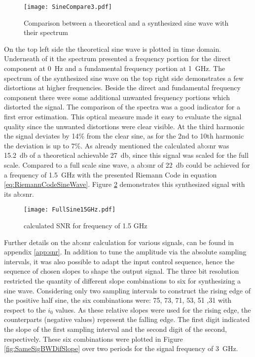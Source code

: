 \begin{figure}[htb!]
	\centering
  \texttt{[image: SineCompare3.pdf]}
	\caption{Comparison between a theoretical and a synthesized sine wave with their spectrum}
	\label{fig:SineCompare}
\end{figure}

On the top left side the theoretical sine wave is plotted in time domain. 
Underneath of it the spectrum presented a frequency portion for the direct component at \SI{0} {\Hz} and a fundamental frequency portion at \SI{1}{\GHz}. 
The spectrum of the synthesized sine wave on the top right side demonstrates a few distortions at higher frequencies.
Beside the direct and fundamental frequency component there were some additional unwanted frequency portions which distorted the signal.
The comparison of the spectra was a good indicator for a first error estimation.
This optical measure made it easy to evaluate the signal quality since the unwanted distortions were clear visible.
At the third harmonic the signal deviates by 14\% from the clear sine, as for the 2nd to 10th harmonic the deviation is up to 7\%.
As already mentioned the calculated \gls{ab:snr} was \SI{15.2}{\decibel} of a theoretical achievable \SI{27}{\decibel}, since this signal was scaled for the full scale.
Compared to a full scale sine wave, a \gls{ab:snr} of \SI{22}{\decibel} could be achieved for a frequency of \SI{1.5}{\giga \hertz} with the presented Riemann Code in equation \ref{eq:RiemannCodeSineWave}.
Figure \ref{fig:SNRSine1.5GHz} demonstrates this synthesized signal with its \gls{ab:snr}.

\begin{figure}[htb]
	\centering
  \texttt{[image: FullSine15GHz.pdf]}
	\caption{calculated SNR for frequency of 1.5 GHz}
	\label{fig:SNRSine1.5GHz}
\end{figure}

Further details on the \gls{ab:snr} calculation for various signals, can be found in appendix \ref{app:snr}.
In addition to tune the amplitude via the absolute sampling intervals, it was also possible to adapt the input control sequence, hence the sequence of chosen slopes to shape the output signal.
The three bit resolution restricted the quantity of different slope combinations to six for synthesizing a sine wave.
Considering only two sampling intervals to construct the rising edge of the positive half sine, the six combinations were: 75, 73, 71, 53, 51 ,31 with respect to the $i_0$ values.
As these relative slopes were used for the rising edge, the counterparts (negative values) represent the falling edge.
The first digit indicated the slope of the first sampling interval and the second digit of the second, respectively. 
These six combinations were plotted in Figure \ref{fig:SameSigBWDifSlope} over two periods for the signal frequency of \SI{3}{\GHz}. 

